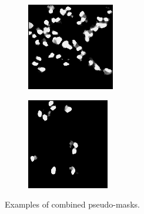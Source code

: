 \begin{figure}[H]
\begin{subfigure}[b]{0.24\textwidth}
  \end{subfigure}\hfill
  \begin{subfigure}[b]{0.24\textwidth}
    \centering
    \includegraphics[width=\linewidth]{assets/images/for_presentation/combined-3.png}
  \end{subfigure}
  \begin{subfigure}[b]{0.24\textwidth}
    \centering
    \includegraphics[width=\linewidth]{assets/images/for_presentation/combined-4.png}
  \end{subfigure}
  \caption{Examples of combined pseudo-masks.}
  \label{fig:combined-vis}
\end{figure}

